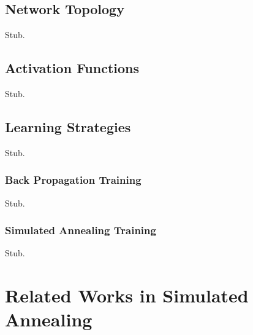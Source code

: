 \documentclass[11pt]{afthesis}
\begin{document}
	
	
	
	
	\subsection{Network Topology}
	
	Stub.
	
	\subsection{Activation Functions}
	
	Stub.
	
	\subsection{Learning Strategies}
	
	Stub.
	
	
	
	
	\subsubsection{Back Propagation Training} \label{sec:backpropTraining}
	Stub.
	
	
	
	
	
	
	
	\subsubsection{Simulated Annealing Training} 
	Stub.
	
	
	
	\section{Related Works in Simulated Annealing} \label{eq:simulatedAnnealing}
	
\end{document}
